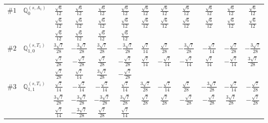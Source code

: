 \documentclass[fleqn,9pt,landscape]{jsarticle}
\begin{document}
\begin{center}
\begin{longtable}{lcccccccccc}
$ \#1\quad \mathbb{Q}_{0}^{(s,A_{1})} $ & $ \frac{\sqrt{6}}{12} $ & $ \frac{\sqrt{6}}{12} $ & $ \frac{\sqrt{6}}{12} $ & $ \frac{\sqrt{6}}{12} $ & $ \frac{\sqrt{6}}{12} $ & $ \frac{\sqrt{6}}{12} $ & $ \frac{\sqrt{6}}{12} $ & $ \frac{\sqrt{6}}{12} $ & $ \frac{\sqrt{6}}{12} $ & $ \frac{\sqrt{6}}{12} $ \\
& $ \frac{\sqrt{6}}{12} $ & $ \frac{\sqrt{6}}{12} $ & $ \frac{\sqrt{6}}{12} $ & $ \frac{\sqrt{6}}{12} $ & $ \frac{\sqrt{6}}{12} $ & $ \frac{\sqrt{6}}{12} $ & $ \frac{\sqrt{6}}{12} $ & $ \frac{\sqrt{6}}{12} $ & $ \frac{\sqrt{6}}{12} $ & $ \frac{\sqrt{6}}{12} $ \\
& $ \frac{\sqrt{6}}{12} $ & $ \frac{\sqrt{6}}{12} $ & $ \frac{\sqrt{6}}{12} $ & $ \frac{\sqrt{6}}{12} $ & $  $ & $  $ & $  $ & $  $ & $  $ & $  $ \\ \hline
$ \#2\quad \mathbb{Q}_{1,0}^{(s,T_{1})} $ & $ \frac{3 \sqrt{7}}{28} $ & $ - \frac{3 \sqrt{7}}{28} $ & $ \frac{3 \sqrt{7}}{28} $ & $ - \frac{3 \sqrt{7}}{28} $ & $ \frac{\sqrt{7}}{14} $ & $ \frac{\sqrt{7}}{28} $ & $ - \frac{3 \sqrt{7}}{28} $ & $ - \frac{\sqrt{7}}{14} $ & $ - \frac{\sqrt{7}}{28} $ & $ - \frac{3 \sqrt{7}}{28} $ \\
& $ \frac{\sqrt{7}}{28} $ & $ - \frac{\sqrt{7}}{28} $ & $ \frac{\sqrt{7}}{28} $ & $ - \frac{\sqrt{7}}{28} $ & $ \frac{\sqrt{7}}{14} $ & $ - \frac{\sqrt{7}}{14} $ & $ - \frac{\sqrt{7}}{14} $ & $ \frac{\sqrt{7}}{14} $ & $ - \frac{\sqrt{7}}{14} $ & $ \frac{3 \sqrt{7}}{28} $ \\
& $ \frac{\sqrt{7}}{28} $ & $ \frac{\sqrt{7}}{14} $ & $ \frac{3 \sqrt{7}}{28} $ & $ - \frac{\sqrt{7}}{28} $ & $  $ & $  $ & $  $ & $  $ & $  $ & $  $ \\ \hline
$ \#3\quad \mathbb{Q}_{1,1}^{(s,T_{1})} $ & $ \frac{\sqrt{7}}{14} $ & $ - \frac{\sqrt{7}}{14} $ & $ - \frac{\sqrt{7}}{14} $ & $ \frac{\sqrt{7}}{14} $ & $ \frac{3 \sqrt{7}}{28} $ & $ - \frac{\sqrt{7}}{14} $ & $ \frac{\sqrt{7}}{28} $ & $ - \frac{3 \sqrt{7}}{28} $ & $ - \frac{\sqrt{7}}{14} $ & $ - \frac{\sqrt{7}}{28} $ \\
& $ \frac{3 \sqrt{7}}{28} $ & $ - \frac{3 \sqrt{7}}{28} $ & $ - \frac{3 \sqrt{7}}{28} $ & $ \frac{3 \sqrt{7}}{28} $ & $ \frac{\sqrt{7}}{28} $ & $ \frac{\sqrt{7}}{28} $ & $ - \frac{\sqrt{7}}{28} $ & $ - \frac{\sqrt{7}}{28} $ & $ \frac{3 \sqrt{7}}{28} $ & $ - \frac{\sqrt{7}}{28} $ \\
& $ \frac{\sqrt{7}}{14} $ & $ - \frac{3 \sqrt{7}}{28} $ & $ \frac{\sqrt{7}}{28} $ & $ \frac{\sqrt{7}}{14} $ & $  $ & $  $ & $  $ & $  $ & $  $ & $  $ \\ \hline

\end{longtable}
\end{center}
\end{document}
